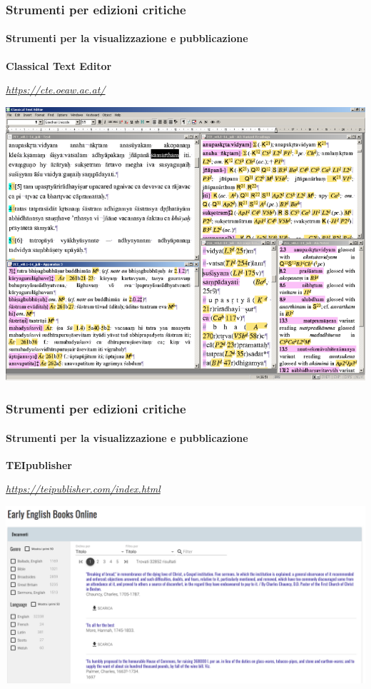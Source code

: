 \begin{frame}
    \frametitle{Strumenti per edizioni critiche}
    \framesubtitle{Strumenti per la visualizzazione e pubblicazione}
	\addtocounter{nframe}{1}
    \begin{center}
        \textbf{Classical Text Editor}
    \end{center}
    \begin{center}
        \textit{\url{https://cte.oeaw.ac.at/}}
	\end{center}
    \begin{center}
        \includegraphics[width=.95\textwidth]{imgs/cte.png}
	\end{center}
\end{frame}

\begin{frame}
    \frametitle{Strumenti per edizioni critiche}
    \framesubtitle{Strumenti per la visualizzazione e pubblicazione}
	\addtocounter{nframe}{1}
    \begin{center}
        \textbf{TEIpublisher}
    \end{center}
    \begin{center}
        \textit{\url{https://teipublisher.com/index.html}}
	\end{center}
    \begin{center}
        \includegraphics[width=.95\textwidth]{imgs/teipublisher.png}
	\end{center}
\end{frame}

